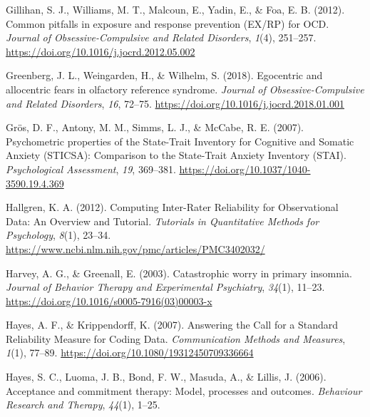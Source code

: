 \documentclass[
  man,floatsintext]{apa7}
\newlength{\cslhangindent}
\newlength{\cslentryspacingunit} %
\newenvironment{CSLReferences}[2] %
 {%
  \setlength{\parindent}{0pt}
  \ifodd #1
  \let\oldpar\par
  \def\par{\hangindent=\cslhangindent\oldpar}
  \fi
  \setlength{\parskip}{#2\cslentryspacingunit}
 }%
 {}
\begin{document}
\begin{CSLReferences}{1}{0}
\leavevmode{}%
Gillihan, S. J., Williams, M. T., Malcoun, E., Yadin, E., \& Foa, E. B. (2012). Common pitfalls in exposure and response prevention (EX/RP) for OCD. \emph{Journal of Obsessive-Compulsive and Related Disorders}, \emph{1}(4), 251--257. \url{https://doi.org/10.1016/j.jocrd.2012.05.002}

\leavevmode{}%
Greenberg, J. L., Weingarden, H., \& Wilhelm, S. (2018). Egocentric and allocentric fears in olfactory reference syndrome. \emph{Journal of Obsessive-Compulsive and Related Disorders}, \emph{16}, 72--75. \url{https://doi.org/10.1016/j.jocrd.2018.01.001}

\leavevmode{}%
Grös, D. F., Antony, M. M., Simms, L. J., \& McCabe, R. E. (2007). Psychometric properties of the State-Trait Inventory for Cognitive and Somatic Anxiety (STICSA): Comparison to the State-Trait Anxiety Inventory (STAI). \emph{Psychological Assessment}, \emph{19}, 369--381. \url{https://doi.org/10.1037/1040-3590.19.4.369}

\leavevmode{}%
Hallgren, K. A. (2012). Computing Inter-Rater Reliability for Observational Data: An Overview and Tutorial. \emph{Tutorials in Quantitative Methods for Psychology}, \emph{8}(1), 23--34. \url{https://www.ncbi.nlm.nih.gov/pmc/articles/PMC3402032/}

\leavevmode{}%
Harvey, A. G., \& Greenall, E. (2003). Catastrophic worry in primary insomnia. \emph{Journal of Behavior Therapy and Experimental Psychiatry}, \emph{34}(1), 11--23. \url{https://doi.org/10.1016/s0005-7916(03)00003-x}

\leavevmode{}%
Hayes, A. F., \& Krippendorff, K. (2007). Answering the Call for a Standard Reliability Measure for Coding Data. \emph{Communication Methods and Measures}, \emph{1}(1), 77--89. \url{https://doi.org/10.1080/19312450709336664}

\leavevmode{}%
Hayes, S. C., Luoma, J. B., Bond, F. W., Masuda, A., \& Lillis, J. (2006). Acceptance and commitment therapy: Model, processes and outcomes. \emph{Behaviour Research and Therapy}, \emph{44}(1), 1--25.


\end{CSLReferences}
\end{document}
